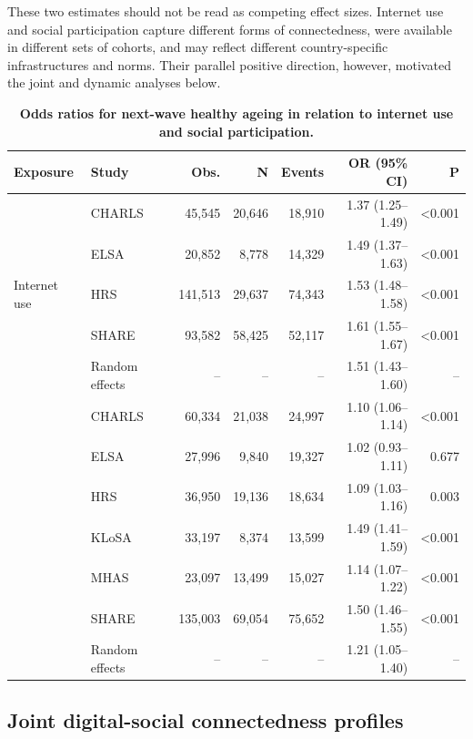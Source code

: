 \documentclass[pdflatex,sn-nature]{sn-jnl}
\begin{document}
These two estimates should not be read as competing effect sizes. Internet use and social participation capture different forms of connectedness, were available in different sets of cohorts, and may reflect different country-specific infrastructures and norms. Their parallel positive direction, however, motivated the joint and dynamic analyses below.

\begin{table}[!htbp]
\caption{\textbf{Odds ratios for next-wave healthy ageing in relation to internet use and social participation.}}
\label{tab:main}
\centering
\scriptsize
\setlength{\tabcolsep}{3pt}
\renewcommand{\arraystretch}{0.92}
\begin{tabular*}{\textwidth}{@{\extracolsep{\fill}}llrrrrr@{}}
\toprule
Exposure & Study & Obs. & N & Events & OR (95\% CI) & P \\
\midrule
\multirow{5}{*}{Internet use}
& CHARLS & 45,545 & 20,646 & 18,910 & 1.37 (1.25--1.49) & <0.001 \\
& ELSA & 20,852 & 8,778 & 14,329 & 1.49 (1.37--1.63) & <0.001 \\
& HRS & 141,513 & 29,637 & 74,343 & 1.53 (1.48--1.58) & <0.001 \\
& SHARE & 93,582 & 58,425 & 52,117 & 1.61 (1.55--1.67) & <0.001 \\
& Random effects & -- & -- & -- & 1.51 (1.43--1.60) & -- \\
\addlinespace
\multirow{7}{*}{Social participation}
& CHARLS & 60,334 & 21,038 & 24,997 & 1.10 (1.06--1.14) & <0.001 \\
& ELSA & 27,996 & 9,840 & 19,327 & 1.02 (0.93--1.11) & 0.677 \\
& HRS & 36,950 & 19,136 & 18,634 & 1.09 (1.03--1.16) & 0.003 \\
& KLoSA & 33,197 & 8,374 & 13,599 & 1.49 (1.41--1.59) & <0.001 \\
& MHAS & 23,097 & 13,499 & 15,027 & 1.14 (1.07--1.22) & <0.001 \\
& SHARE & 135,003 & 69,054 & 75,652 & 1.50 (1.46--1.55) & <0.001 \\
& Random effects & -- & -- & -- & 1.21 (1.05--1.40) & -- \\
\bottomrule
\end{tabular*}
\renewcommand{\arraystretch}{1.0}
\setlength{\tabcolsep}{6pt}
\end{table}
\FloatBarrier

\subsection{Joint digital-social connectedness profiles}
\end{document}

